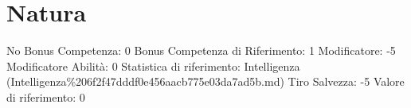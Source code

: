 \section{Natura}\label{natura}

\begin{description}
\tightlist
\item[Tags: ABI]
No Bonus Competenza: 0 Bonus Competenza di Riferimento: 1 Modificatore:
-5 Modificatore Abilità: 0 Statistica di riferimento: Intelligenza
(Intelligenza\%206f2f47dddf0e456aacb775e03da7ad5b.md) Tiro Salvezza: -5
Valore di riferimento: 0
\end{description}
